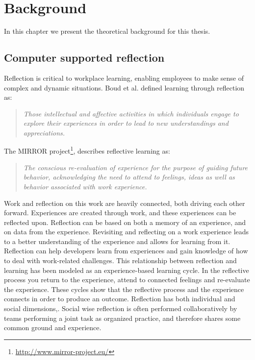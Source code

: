 \chapter{Background}
\label{chap:background}
In this chapter we present the theoretical background for this thesis. 

\section{Computer supported reflection}
Reflection is critical to workplace learning, enabling employees to make sense of complex and dynamic situations\citep{Schon1983}. Boud et al.\citep{boudreflection1985} defined learning through reflection as: 
\begin{quote}
\emph{Those intellectual and affective activities in which individuals engage to explore their experiences in order to lead to new understandings and appreciations.}
\end{quote}
The MIRROR project\footnote{\url{http://www.mirror-project.eu/}}, describes reflective learning as:
\begin{quote}
\emph{The conscious re-evaluation of experience for the purpose of guiding future behavior, acknowledging the need to attend to feelings, ideas as well as behavior associated with work experience.}\citep{krogstiemodel}
\end{quote}

Work and reflection on this work are heavily connected\citep{Schon1983}, both driving each other forward. Experiences are created through work, and these experiences can be reflected upon. Reflection can be based on both a memory of an experience, and on data from the experience. Revisiting and reflecting on a work experience leads to a better understanding of the experience and allows for learning from it. Reflection can help developers learn from experiences and gain knowledge of how to deal with work-related challenges. This relationship between reflection and learning has been modeled as an experience-based learning cycle\citep{boudreflection1985,Korthagen_Vasalos_2005, KolbModel}. In the reflective process you return to the experience, attend to connected feelings and re-evaluate
the experience. These cycles show that the reflective process and the experience connects in order to produce an outcome.
Reflection has both individual and social dimensions,\citep{Høyrup_2004,Woerkom_Croon_2008}. Social wise reflection is often performed collaboratively by teams performing a joint task as organized practice, and therefore shares some common ground and experience. 

